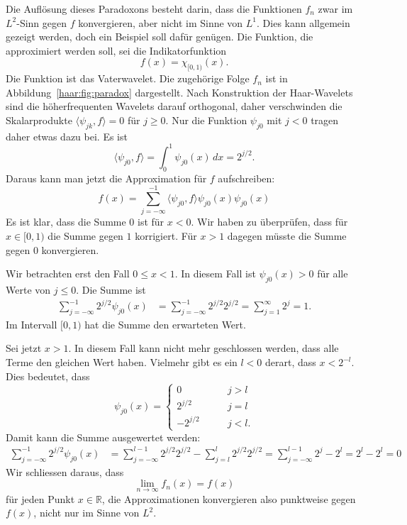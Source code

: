 Die Auflösung dieses Paradoxons besteht darin, dass die Funktionen
$f_n$ zwar im $L^2$-Sinn gegen $f$ konvergieren, aber nicht im Sinne von $L^1$.
Dies kann allgemein gezeigt werden, doch ein Beispiel soll dafür genügen.
Die Funktion, die approximiert werden soll, sei die Indikatorfunktion
\[
f(x) = \chi_{[0,1)}(x).
\]
Die Funktion ist das Vaterwavelet.
Die zugehörige Folge $f_n$ ist in Abbildung~\ref{haar:fig:paradox}
dargestellt.
Nach Konstruktion der Haar-Wavelets sind die höherfrequenten Wavelets
darauf orthogonal, daher verschwinden die Skalarprodukte
$\langle \psi_{jk},f\rangle=0$ für $j\ge 0$.
Nur die Funktion $\psi_{j0}$ mit $j<0$ tragen daher etwas dazu bei.
Es ist
\[
\langle \psi_{j0},f\rangle
=
\int_0^1 \psi_{j0}(x)\,dx
=
2^{j/2}.
\]
Daraus kann man jetzt die Approximation für $f$ aufschreiben:
\[
f(x)
=
\sum_{j=-\infty}^{-1} \langle \psi_{j0},f\rangle \psi_{j0}(x)
\psi_{j0}(x)
\]
Es ist klar, dass die Summe $0$ ist für $x<0$.
Wir haben zu überprüfen, dass für $x\in[0,1)$ die Summe gegen $1$ 
korrigiert. 
Für $x>1$ dagegen müsste die Summe gegen $0$ konvergieren.

Wir betrachten erst den Fall $0\le x < 1$.
In diesem Fall ist $\psi_{j0}(x)>0$ für alle Werte von $j\le 0$.
Die Summe ist
\begin{align*}
\sum_{j=-\infty}^{-1} 2^{j/2} \psi_{j0}(x)
&=
\sum_{j=-\infty}^{-1} 2^{j/2} 2^{j/2}
=
\sum_{j=1}^\infty 2^j = 1.
\end{align*}
Im Intervall $[0,1)$ hat die Summe den erwarteten Wert.

Sei jetzt $x>1$.
In diesem Fall kann nicht mehr geschlossen werden, dass alle Terme den
gleichen Wert haben.
Vielmehr gibt es ein $l<0$ derart, dass $x < 2^{-l}$.
Dies bedeutet, dass
\[
\psi_{j0}(x)
=
\begin{cases}
0&\qquad j>l\\
2^{j/2}&\qquad j = l
\\
-2^{j/2}&\qquad j < l.
\end{cases}
\]
Damit kann die Summe ausgewertet werden:
\begin{align*}
\sum_{j=-\infty}^{-1} 2^{j/2} \psi_{j0}(x)
&=
\sum_{j=-\infty}^{l-1} 2^{j/2} 2^{j/2}
-
\sum_{j=l}^{l} 2^{j/2} 2^{j/2}
=
\sum_{j=-\infty}^{l-1} 2^j
-
2^l
=
2^l
-
2^l
=
0
\end{align*}
Wir schliessen daraus, dass 
\[
\lim_{n\to\infty} f_n(x) = f(x)
\]
für jeden Punkt $x\in\mathbb R$, die Approximationen konvergieren also
punktweise gegen $f(x)$, nicht nur im Sinne von $L^2$.

